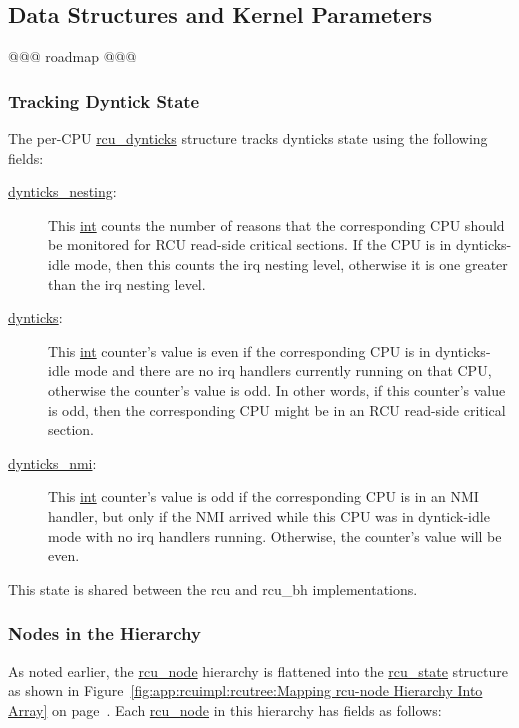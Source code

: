 \subsection{Data Structures and Kernel Parameters}
\label{app:rcuimpl:rcutreewt:Data Structures and Kernel Parameters}

@@@ roadmap @@@

\subsubsection{Tracking Dyntick State}
\label{app:rcuimpl:rcutreewt:Tracking Dyntick State}

The per-CPU \url{rcu_dynticks} structure tracks dynticks state using the
following fields:

\begin{description}
\item[\url{dynticks_nesting}:]
	This \url{int} counts the number of reasons that the corresponding
	CPU should be monitored for RCU read-side critical sections.
	If the CPU is in dynticks-idle mode, then this counts the
	irq nesting level, otherwise it is one greater than the
	irq nesting level.
\item[\url{dynticks}:]
	This \url{int} counter's value is even if the corresponding CPU is
	in dynticks-idle mode and there are no irq handlers currently
	running on that CPU, otherwise the counter's value is odd.
	In other words, if this counter's value is odd, then the
	corresponding CPU might be in an RCU read-side critical section.
\item[\url{dynticks_nmi}:]
	This \url{int} counter's value is odd if the corresponding CPU is
	in an NMI handler, but only if the NMI arrived while this
	CPU was in dyntick-idle mode with no irq handlers running.
	Otherwise, the counter's value will be even.
\end{description}

This state is shared between the rcu and rcu\_bh implementations.

\subsubsection{Nodes in the Hierarchy}
\label{app:rcuimpl:rcutreewt:Nodes in the Hierarchy}

As noted earlier, the \url{rcu_node} hierarchy is flattened into
the \url{rcu_state} structure as shown in
Figure~\ref{fig:app:rcuimpl:rcutree:Mapping rcu-node Hierarchy Into Array}
on
page~\pageref{fig:app:rcuimpl:rcutree:Mapping rcu-node Hierarchy Into Array}.
Each \url{rcu_node} in this hierarchy has fields as follows:


